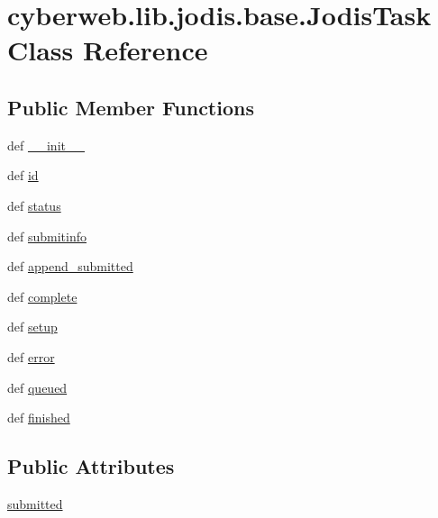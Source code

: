 \hypertarget{classcyberweb_1_1lib_1_1jodis_1_1base_1_1_jodis_task}{\section{cyberweb.\-lib.\-jodis.\-base.\-Jodis\-Task \-Class \-Reference}
\label{classcyberweb_1_1lib_1_1jodis_1_1base_1_1_jodis_task}
}
\subsection*{\-Public \-Member \-Functions}
\begin{DoxyCompactItemize}
\item 
def \hyperlink{classcyberweb_1_1lib_1_1jodis_1_1base_1_1_jodis_task_abd6524f7d49b5854c2fade5cae2311a9}{\-\_\-\-\_\-init\-\_\-\-\_\-}
\item 
def \hyperlink{classcyberweb_1_1lib_1_1jodis_1_1base_1_1_jodis_task_ab27f4b9763294b499db529f4c8825975}{id}
\item 
def \hyperlink{classcyberweb_1_1lib_1_1jodis_1_1base_1_1_jodis_task_a870b8fd19461575e64cb9de7c52a0713}{status}
\item 
def \hyperlink{classcyberweb_1_1lib_1_1jodis_1_1base_1_1_jodis_task_ae62b286387a785bac3df035d084c4298}{submitinfo}
\item 
def \hyperlink{classcyberweb_1_1lib_1_1jodis_1_1base_1_1_jodis_task_a69fdebff80567904f479d139428dd36e}{append\-\_\-submitted}
\item 
def \hyperlink{classcyberweb_1_1lib_1_1jodis_1_1base_1_1_jodis_task_a1bef17610c3c476b1a280c2d312a70a0}{complete}
\item 
def \hyperlink{classcyberweb_1_1lib_1_1jodis_1_1base_1_1_jodis_task_a3af215b18060eb64c356b83552742903}{setup}
\item 
def \hyperlink{classcyberweb_1_1lib_1_1jodis_1_1base_1_1_jodis_task_ad3548fdb3711de42ac08d6e7145a6d2a}{error}
\item 
def \hyperlink{classcyberweb_1_1lib_1_1jodis_1_1base_1_1_jodis_task_ad83b92c5d56697ce7a98e0d189c1717b}{queued}
\item 
def \hyperlink{classcyberweb_1_1lib_1_1jodis_1_1base_1_1_jodis_task_a8a43586431e85d8186840455e91f324d}{finished}
\end{DoxyCompactItemize}
\subsection*{\-Public \-Attributes}
\begin{DoxyCompactItemize}
\item 
\hyperlink{classcyberweb_1_1lib_1_1jodis_1_1base_1_1_jodis_task_abec676c8bbce77bc0dfb890e06cd81ba}{submitted}
\end{DoxyCompactItemize}


